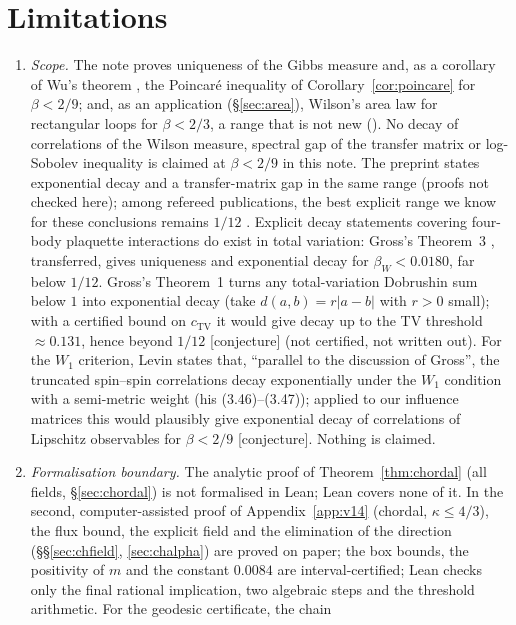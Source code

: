 \documentclass[11pt,a4paper]{article}
\theoremstyle{remark}
\theoremstyle{definition}
\theoremstyle{plain}
\theoremstyle{remark}
\newcommand{\st}[1]{\textsf{[#1]}}
\begin{document}
\section{Limitations}\label{sec:limits}
\begin{enumerate}
\item \emph{Scope.} The note proves uniqueness of the Gibbs measure and, as a corollary of Wu's theorem \cite{Wu06}, the Poincar\'e
inequality of Corollary~\ref{cor:poincare} for $\beta<2/9$; and, as an application (\S\ref{sec:area}), Wilson's area law for rectangular
loops for $\beta<2/3$, a range that is not new (\cite{BS83}). No decay of correlations of the Wilson measure, spectral gap of the
transfer matrix or log-Sobolev inequality is claimed at $\beta<2/9$ in this note. The preprint \cite{BB26} states exponential decay and a transfer-matrix gap
in the same range (proofs not checked here); among refereed publications, the best explicit range we know for
these conclusions remains $1/12$ \cite{SZZ23}. Explicit decay statements covering four-body plaquette interactions do exist in total
variation: Gross's Theorem~3 \cite{Gro79}, transferred, gives uniqueness and exponential decay for
$\beta_W<0.0180$, far below $1/12$. Gross's Theorem~1 \cite[p.~11]{Gro79} turns any total-variation Dobrushin sum
below $1$ into exponential decay (take $d(a,b)=r|a-b|$ with $r>0$ small); with a certified bound on $c_{\mathrm{TV}}$
it would give decay up to the TV threshold $\approx0.131$, hence beyond $1/12$ \st{conjecture} (not certified,
not written out). For the $W_1$ criterion, Levin \cite[Remark~3.5, p.~72]{Lev80} states that, ``parallel to the
discussion of Gross'', the truncated spin--spin correlations decay exponentially under the $W_1$ condition with a
semi-metric weight (his (3.46)--(3.47)); applied to our influence matrices this would plausibly give exponential
decay of correlations of Lipschitz observables for $\beta<2/9$ \st{conjecture}. Nothing is claimed.
\item \emph{Formalisation boundary.} The analytic proof of Theorem~\ref{thm:chordal} (all fields, \S\ref{sec:chordal}) is not formalised in Lean; Lean covers none of it.
In the second, computer-assisted proof of Appendix~\ref{app:v14} (chordal, $\kappa\le4/3$), the flux bound, the explicit field and the elimination of the direction
(\S\S\ref{sec:chfield}, \ref{sec:chalpha}) are proved on paper; the box bounds, the positivity of $m$ and the constant $0.0084$ are interval-certified; Lean checks only the final rational
implication, two algebraic steps and the threshold arithmetic. For the geodesic certificate, the chain

\end{enumerate}
\end{document}
